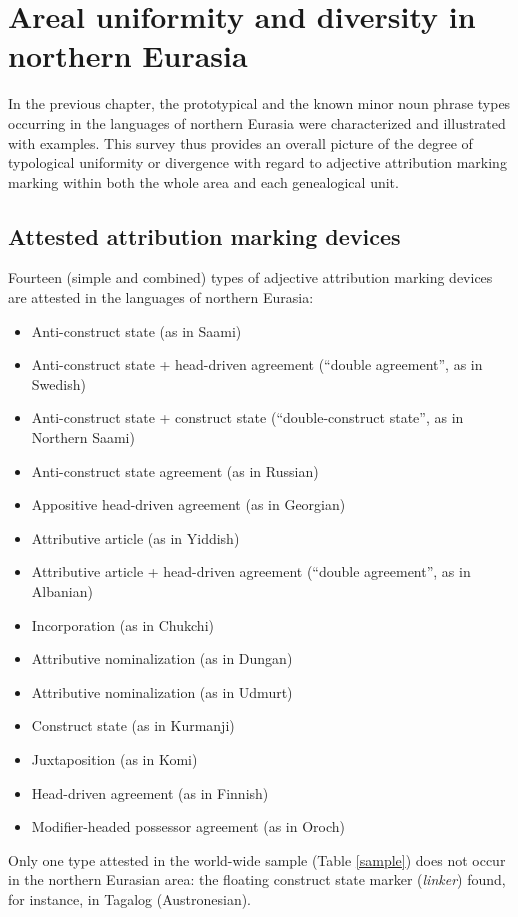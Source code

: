
\chapter[Areal uniformity and diversity]{Areal uniformity and diversity in northern Eurasia}\label{areality}
In the previous chapter, the prototypical and the known minor noun phrase types occurring in the languages of northern Eurasia were characterized and illustrated with examples. This survey thus provides an overall picture of the degree of typological uniformity or divergence with regard to adjective attribution marking marking within both the whole area and each genealogical unit.

\section{Attested attribution marking devices}
Fourteen (simple and combined) types of adjective attribution marking devices are attested in the languages of northern Eurasia:
\begin{itemize}
\item Anti-construct state (as in Saami)
\item Anti-construct state + head-driven agreement (“double agreement”, as in Swedish)
\item Anti-construct state + construct state (“double-construct state”, as in Northern Saami)
\item Anti-construct state agreement (as in Russian)
\item Appositive head-driven agreement (as in Georgian)
\item Attributive article (as in Yiddish)
\item Attributive article + head-driven agreement (“double agreement”, as in Albanian)
\item Incorporation (as in Chukchi)
\item Attributive nominalization (as in Dungan)
\item Attributive nominalization (as in Udmurt)
\item Construct state (as in Kurmanji)
\item Juxtaposition (as in Komi)
\item Head-driven agreement (as in Finnish)
\item Modifier-headed possessor agreement (as in Oroch)
\end{itemize}
Only one type attested in the world-wide sample (Table \ref{sample}) does not occur in the northern Eurasian area: the floating construct state marker (\textit{linker}) found, for instance, in Tagalog (Austronesian). 

